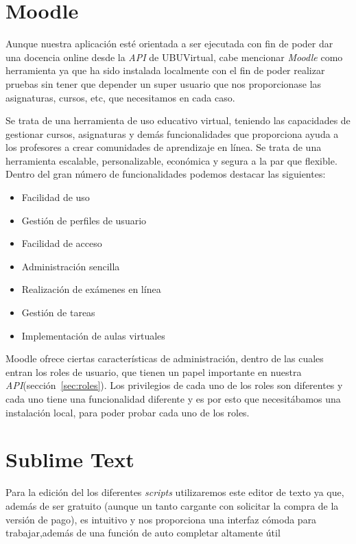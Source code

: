 
\section{Moodle}\label{sec:moodle-local}
Aunque nuestra aplicación esté orientada a ser ejecutada con fin de poder dar una docencia online desde la \textit{API} de UBUVirtual, cabe mencionar \textit{Moodle} como herramienta ya que ha sido instalada localmente con el fin de poder realizar pruebas sin tener que depender un super usuario que nos proporcionase las asignaturas, cursos, etc, que necesitamos en cada caso.

Se trata de una herramienta de uso educativo virtual, teniendo las capacidades de gestionar cursos, asignaturas y demás funcionalidades que proporciona ayuda a los profesores a crear comunidades de aprendizaje en línea. Se trata de una herramienta escalable, personalizable, económica y segura a la par que flexible. Dentro del gran número de funcionalidades podemos destacar las siguientes:

\begin{itemize}
	\item Facilidad de uso
	\item Gestión de perfiles de usuario
	\item Facilidad de acceso
	\item Administración sencilla
	\item Realización de exámenes en línea
	\item Gestión de tareas
	\item Implementación de aulas virtuales
\end{itemize}

Moodle ofrece ciertas características de administración, dentro de las cuales entran los roles de usuario, que tienen un papel importante en nuestra \textit{API}(sección~\ref{sec:roles}). Los privilegios de cada uno de los roles son diferentes y cada uno tiene una funcionalidad diferente y es por esto que necesitábamos una instalación local, para poder probar cada uno de los roles.~\cite{wiki:moodle}
\section{Sublime Text}
Para la edición del los diferentes \textit{scripts} utilizaremos este editor de texto ya que, además de ser gratuito (aunque un tanto cargante con solicitar la compra de la versión de pago), es intuitivo y nos proporciona una interfaz cómoda para trabajar,además de una función de auto completar altamente útil

